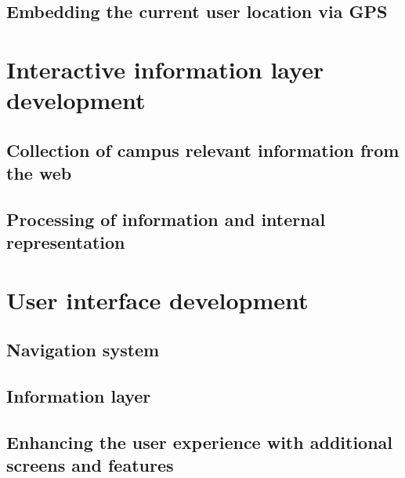 \subsection{Embedding the current user location via GPS}

\section{Interactive information layer development}
\subsection{Collection of campus relevant information from the web}
\subsection{Processing of information and internal representation}

\section{User interface development}
\subsection{Navigation system}
\subsection{Information layer}
\subsection{Enhancing the user experience with additional screens and features}